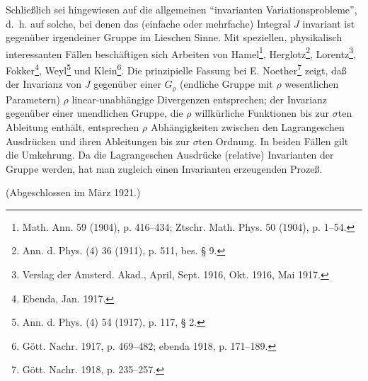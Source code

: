 \documentclass[11pt]{article}
\begin{document}
Schließlich sei hingewiesen auf die allgemeinen ``invarianten Variationsprobleme'', d.~h. auf solche, bei denen das (einfache oder mehrfache) Integral $J$ invariant ist gegenüber irgendeiner Gruppe im Lieschen Sinne. Mit speziellen, physikalisch interessanten Fällen beschäftigen sich Arbeiten von Hamel\footnote{Math. Ann. 59 (1904), p. 416--434; Ztschr. Math. Phys. 50 (1904), p. 1--54.}, Herglotz\footnote{Ann. d. Phys. (4) 36 (1911), p. 511, bes. § 9.}, Lorentz\footnote{Verslag der Amsterd. Akad., April, Sept. 1916, Okt. 1916, Mai 1917.}, Fokker\footnote{Ebenda, Jan. 1917.}, Weyl\footnote{Ann. d. Phys. (4) 54 (1917), p. 117, § 2.} und Klein\footnote{Gött. Nachr. 1917, p. 469--482; ebenda 1918, p. 171--189.}. Die prinzipielle Fassung bei E. Noether\footnote{Gött. Nachr. 1918, p. 235--257.} zeigt, daß der Invarianz von $J$ gegenüber einer $G_\rho$ (endliche Gruppe mit $\rho$ wesentlichen Parametern) $\rho$ linear-unabhängige Divergenzen entsprechen; der Invarianz gegenüber einer unendlichen Gruppe, die $\rho$ willkürliche Funktionen bis zur $\sigma$ten Ableitung enthält, entsprechen $\rho$ Abhängigkeiten zwischen den Lagrangeschen Ausdrücken und ihren Ableitungen bis zur $\sigma$ten Ordnung. In beiden Fällen gilt die Umkehrung. Da die Lagrangeschen Ausdrücke (relative) Invarianten der Gruppe werden, hat man zugleich einen Invarianten erzeugenden Prozeß.

\begin{center}
(Abgeschlossen im März 1921.)
\end{center}
\end{document}
